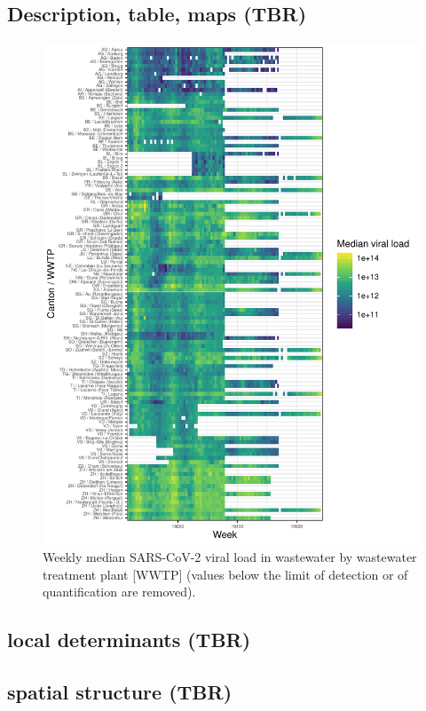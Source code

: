 \documentclass[10pt,letterpaper]{article}
\begin{document}
\subsection{Description, table, maps (TBR)}

\begin{figure}[b]
	\includegraphics[width=\linewidth]{figures/fig1b.pdf}
	\caption{Weekly median SARS-CoV-2 viral load in wastewater by wastewater treatment plant [WWTP] (values below the limit of detection or of quantification are removed). }
	\label{fig_desc}
\end{figure}

\subsection{local determinants (TBR)}

\subsection{spatial structure (TBR)}
\end{document}
